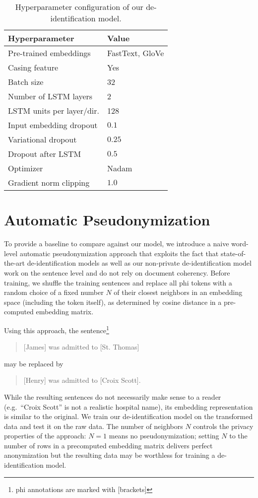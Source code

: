 \begin{table}
    \centering
    \begin{tabular}{ll}
     \toprule
     Hyperparameter & Value\\
     \midrule
     Pre-trained embeddings & FastText, GloVe\\
     Casing feature & Yes\\
     Batch size & 32\\
     Number of LSTM layers & 2\\
     LSTM units per layer/dir. & 128\\
     Input embedding dropout & $0.1$\\
     Variational dropout & $0.25$\\
     Dropout after LSTM & $0.5$\\
     Optimizer & Nadam\\
     Gradient norm clipping & $1.0$\\
     \bottomrule
    \end{tabular}
    \caption{Hyperparameter configuration of our de-identification model.}\label{tab:deid-hyperparameters}
\end{table}


\section{Automatic Pseudonymization}\label{sec:automatic-pseudonymization}
%
To provide a baseline to compare against our model, we introduce a naive word-level automatic pseudonymization approach that exploits the fact that state-of-the-art de-identification models \citep{liu2017identification,dernoncourt2017identification} as well as our non-private de-identification model work on the sentence level and do not rely on document coherency.
%
Before training, we shuffle the training sentences and replace all \ac{phi} tokens with a random choice of a fixed number $N$ of their closest neighbors in an embedding space (including the token itself), as determined by cosine distance in a pre-computed embedding matrix.

%
Using this approach, the sentence\footnote{\ac{phi} annotations are marked with [brackets]}
%
\begin{quote}
    [James] was admitted to [St. Thomas]
\end{quote}
%
may be replaced by
\begin{quote}
    [Henry] was admitted to [Croix Scott].
\end{quote}
%
While the resulting sentences do not necessarily make sense to a reader (e.g.\ ``Croix Scott'' is not a realistic hospital name), its embedding representation is similar to the original.
%
We train our de-identification model on the transformed data and test it on the raw data.
%
The number of neighbors $N$ controls the privacy properties of the approach: $N = 1$ means no pseudonymization; setting $N$ to the number of rows in a precomputed embedding matrix delivers perfect anonymization but the resulting data may be worthless for training a de-identification model.

